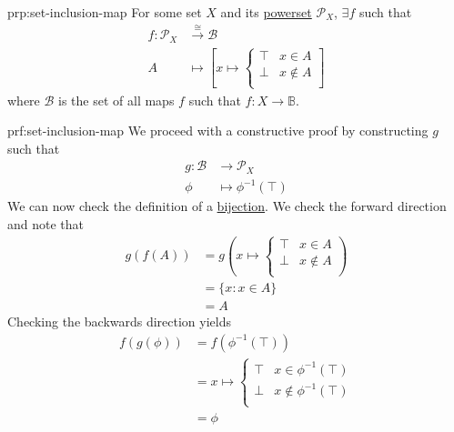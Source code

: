 \begin{prp}{prp:set-inclusion-map}
    For some set \( X \) and its \hyperref[eg:powerset]{powerset} \( \mathcal{P}_{X} \), \( \exists f \) such that
    \begin{align*}
        f : \mathcal{P}_{X} &\xrightarrow{\cong} \mathcal{B} \\
        A &\mapsto
        \left [
            x \mapsto
            \begin{cases}
                \top & x \in A \\
                \bot & x \notin A \\
            \end{cases}
        \right]
    \end{align*}
    where \( \mathcal{B} \) is the set of all maps \( f \) such that \( f : X \to \mathbb{B} \).
\end{prp}

\begin{prf}{prf:set-inclusion-map}
    We proceed with a constructive proof by constructing \( g \) such that
    \begin{align*}
        g : \mathcal{B} &\to \mathcal{P}_{X} \\
        \phi &\mapsto \phi^{-1}(\top)
    \end{align*}
    We can now check the definition of a \hyperref[dfn:bijection]{bijection}.
    We check the forward direction and note that
    \begin{align*}
        g(f(A)) &= g
        \left(
            x \mapsto
            \begin{cases}
                \top & x \in A \\
                \bot & x \notin A \\
            \end{cases}
        \right) \\
        &= \{ x : x \in A \} \\
        &= A
    \end{align*}
    Checking the backwards direction yields
    \begin{align*}
        f(g(\phi)) &= f\left( \phi^{-1}(\top) \right) \\
        &= x \mapsto
            \begin{cases}
                \top & x \in \phi^{-1}(\top) \\
                \bot & x \notin \phi^{-1}(\top) \\
            \end{cases} \\
        &= \phi
    \end{align*}
\end{prf}
\newpage
